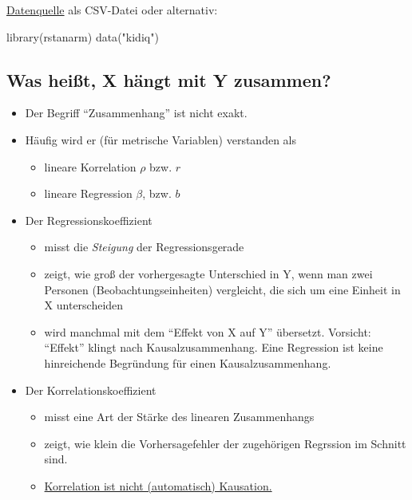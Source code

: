\documentclass[
  a4paper,
  DIV=11]{scrreprt}
\newenvironment{Shaded}{\begin{snugshade}}{\end{snugshade}}
\newcommand{\FunctionTok}[1]{\textcolor[rgb]{0.28,0.35,0.67}{#1}}
\newcommand{\NormalTok}[1]{\textcolor[rgb]{0.00,0.23,0.31}{#1}}
\newcommand{\StringTok}[1]{\textcolor[rgb]{0.13,0.47,0.30}{#1}}
\providecommand{\tightlist}{%
  \setlength{\itemsep}{0pt}\setlength{\parskip}{0pt}}\usepackage{longtable,booktabs,array}
\theoremstyle{definition}
\theoremstyle{remark}
\begin{document}
\href{https://raw.githubusercontent.com/sebastiansauer/Lehre/data/main/Data/kidiq.csv}{Datenquelle}
als CSV-Datei oder alternativ:

\begin{Shaded}
\begin{Highlighting}[]
\FunctionTok{library}\NormalTok{(rstanarm)}
\FunctionTok{data}\NormalTok{(}\StringTok{"kidiq"}\NormalTok{)}
\end{Highlighting}
\end{Shaded}

\hypertarget{was-heiuxdft-x-huxe4ngt-mit-y-zusammen}{%
\subsection{Was heißt, X hängt mit Y
zusammen?}\label{was-heiuxdft-x-huxe4ngt-mit-y-zusammen}}

\begin{itemize}
\tightlist
\item
  Der Begriff ``Zusammenhang'' ist nicht exakt.
\item
  Häufig wird er (für metrische Variablen) verstanden als

  \begin{itemize}
  \tightlist
  \item
    lineare Korrelation \(\rho\) bzw. \(r\)
  \item
    lineare Regression \(\beta\), bzw. \(b\)
  \end{itemize}
\item
  Der Regressionskoeffizient

  \begin{itemize}
  \tightlist
  \item
    misst die \emph{Steigung} der Regressionsgerade
  \item
    zeigt, wie groß der vorhergesagte Unterschied in Y, wenn man zwei
    Personen (Beobachtungseinheiten) vergleicht, die sich um eine
    Einheit in X unterscheiden
  \item
    wird manchmal mit dem ``Effekt von X auf Y'' übersetzt. Vorsicht:
    ``Effekt'' klingt nach Kausalzusammenhang. Eine Regression ist keine
    hinreichende Begründung für einen Kausalzusammenhang.
  \end{itemize}
\item
  Der Korrelationskoeffizient

  \begin{itemize}
  \tightlist
  \item
    misst eine Art der Stärke des linearen Zusammenhangs
  \item
    zeigt, wie klein die Vorhersagefehler der zugehörigen Regrssion im
    Schnitt sind.
  \item
    \href{https://xkcd.com/552/}{Korrelation ist nicht (automatisch)
    Kausation.}
  \end{itemize}
\end{itemize}
\end{document}
